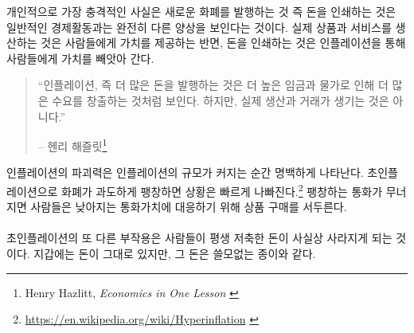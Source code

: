 개인적으로 가장 충격적인 사실은 
새로운 화폐를 발행하는 것 즉 돈을 인쇄하는 것은 일반적인 경제활동과는 완전히 다른 양상을 보인다는 것이다. 
실제 상품과 서비스를 생산하는 것은 사람들에게 가치를 제공하는 반면, 
돈을 인쇄하는 것은 인플레이션을 통해 사람들에게 가치를 빼앗아 간다.

\begin{quotation}\begin{samepage}
		\enquote{인플레이션, 즉 더 많은 돈을 발행하는 것은 더 높은 임금과 물가로 인해 더 많은 수요를 창출하는 것처럼 보인다.
			하지만, 실제 생산과 거래가 생기는 것은 아니다.}
		\begin{flushright} -- 헨리 해즐릿\footnote{Henry Hazlitt, \textit{Economics in One Lesson} \cite{hazlitt}}
\end{flushright}\end{samepage}\end{quotation}

인플레이션의 파괴력은 인플레이션의 규모가 커지는 순간 명백하게 나타난다. 
초인플레이션으로 화폐가 과도하게 팽창하면 상황은 빠르게 나빠진다.\footnote{\url{https://en.wikipedia.org/wiki/Hyperinflation}
	\cite{wiki:hyperinflation}} 
팽창하는 통화가 무너지면 사람들은 낮아지는 통화가치에 대응하기 위해 상품 구매를 서두른다.

\paragraph{}
초인플레이션의 또 다른 부작용은 사람들이 평생 저축한 돈이 사실상 사라지게 되는 것이다. 
지갑에는 돈이 그대로 있지만, 그 돈은 쓸모없는 종이와 같다.

